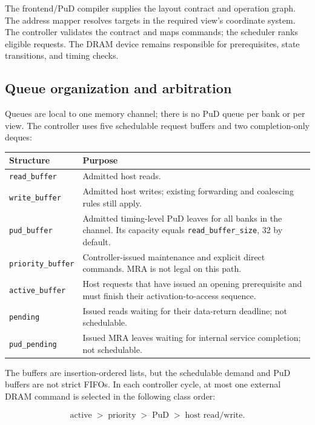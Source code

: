 \documentclass[9pt,twocolumn]{extarticle}
\newcommand{\cmd}[1]{\texttt{#1}}
\begin{document}
The frontend/PuD compiler supplies the layout contract and operation graph.
The address mapper resolves targets in the required view's coordinate system.
The controller validates the contract and maps commands; the scheduler ranks
eligible requests. The DRAM device remains responsible for prerequisites,
state transitions, and timing checks.

\subsection{Queue organization and arbitration}
\label{sec:controller-queues}

Queues are local to one memory channel; there is no PuD queue per bank or per
view. The controller uses five schedulable request buffers and two
completion-only deques:

\begin{center}
\small
\begin{tabularx}{\columnwidth}{@{}p{}X@{}}
\toprule
Structure & Purpose \\
\midrule
\cmd{read\_buffer} & Admitted host reads. \\
\cmd{write\_buffer} & Admitted host writes; existing forwarding and
coalescing rules still apply. \\
\cmd{pud\_buffer} & Admitted timing-level PuD leaves for all banks in the
channel. Its capacity equals \cmd{read\_buffer\_size}, 32 by default. \\
\cmd{priority\_buffer} & Controller-issued maintenance and explicit direct
commands. MRA is not legal on this path. \\
\cmd{active\_buffer} & Host requests that have issued an opening prerequisite
and must finish their activation-to-access sequence. \\
\cmd{pending} & Issued reads waiting for their data-return deadline; not
schedulable. \\
\cmd{pud\_pending} & Issued MRA leaves waiting for internal service completion;
not schedulable. \\
\bottomrule
\end{tabularx}
\end{center}

The buffers are insertion-ordered lists, but the schedulable demand and PuD
buffers are not strict FIFOs. In each controller cycle, at most one external
DRAM command is selected in the following class order:

\begin{equation}
  \text{active} \;>\; \text{priority} \;>\; \text{PuD}
  \;>\; \text{host read/write}.
\end{equation}
\end{document}
